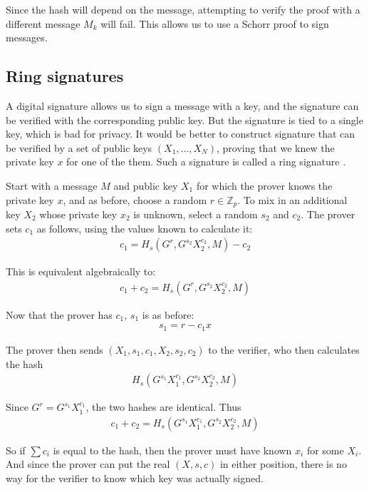 \documentclass{article}
\begin{document}
Since the hash will depend on the message, attempting to verify the proof with a different message $M_k$ will fail.  This allows us to use a Schorr proof to sign messages.

\subsection{Ring signatures}

A digital signature allows us to sign a message with a key, and the signature can be verified with the corresponding public key.  But the signature is tied to a single key, which is bad for privacy.  It would be better to construct signature that can be verified by a set of public keys $(X_1, ..., X_N)$, proving that we knew the private key $x$ for one of the them. Such a signature is called a ring signature \cite{cryptonote}.

Start with a message $M$ and public key $X_1$ for which the prover knows the private key $x$, and as before, choose a random $r \in \mathbb{Z}_p$. To mix in an additional key $X_2$ whose private key $x_2$ is unknown, select a random $s_2$ and $c_2$.  The prover sets $c_1$ as follows, using the values known to calculate it:
\begin{align}
  c_1 = H_s(G^r, G^{s_2} X_2^{c_2}, M) - c_2
\end{align}

This is equivalent algebraically to:
\begin{align}
  c_1 + c_2 = H_s(G^r, G^{s_2} X_2^{c_2}, M)\nonumber
\end{align}

Now that the prover has $c_1$, $s_1$ is as before:
\begin{align}
  s_1 = r - c_1 x\nonumber
\end{align}

The prover then sends $(X_1, s_1, c_1, X_2, s_2, c_2)$ to the verifier, who then calculates the hash
\begin{align}
  H_s(G^{s_1}  X_1^{c_1}, G^{s_2} X_2^{c_2}, M)\nonumber
\end{align}

Since $G^r = G^{s_1} X_1^{c_1}$, the two hashes are identical.  Thus 
\begin{align}
  c_1 + c_2 = H_s(G^{s_1} X_1^{c_1}, G^{s_2} X_2^{c_2}, M)
\end{align}

So if $\sum c_i$ is equal to the hash, then the prover must have known $x_i$ for some $X_i$.  And since the prover can put the real $(X,s,c)$ in either position, there is no way for the verifier to know which key was actually signed.
\end{document}
